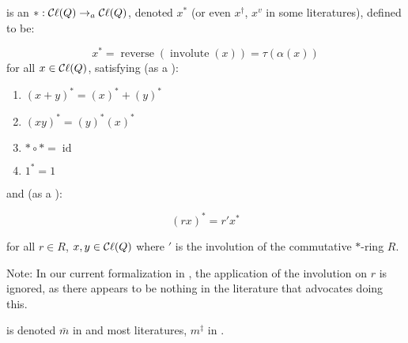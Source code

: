 \begin{definition}
    \label{conjugate}
    \leanok

     is an   ${*} : \mathop{\mathcal{C}\ell}(Q) \to_{a} \mathop{\mathcal{C}\ell}(Q)$,
    denoted $x^{*}$ (or even $x^\dagger$, $x^v$ in some literatures),
    defined to be:

    $$ x^{*} = \operatorname{reverse}(\operatorname{involute}(x)) = \tau(\alpha(x)) $$ for all $x \in \mathop{\mathcal{C}\ell}(Q)$, satisfying
    (as a \href{https://en.wikipedia.org/wiki/*-algebra#*-ring}{}):

    \begin{enumerate}

    \item $(x + y)^{*} = (x)^{*} + (y)^{*}$
    \item $(x y)^{*} = (y)^{*} (x)^{*}$
    \item ${*} \circ {*} = \operatorname{id}$
    \item $1^{*} = 1$
    
    \end{enumerate}

    and (as a \href{https://en.wikipedia.org/wiki/*-algebra#*-algebra}{}):

    $$ (r x)^{*} = r' x^{*} $$
    
    for all $r \in R$, $x, y \in \mathop{\mathcal{C}\ell}(Q)$ where $'$ is the involution of the commutative $*$-ring $R$.

    Note: In our current formalization in \Mathlib, the application of the involution on $r$ is ignored,
    as there appears to be nothing in the literature that advocates doing this.



     is denoted $\bar{m}$ in \cite{lounestoCliffordAlgebrasSpinors2001} and most literatures, $m^\ddagger$ in \cite{chisolm2012geometric}.

\end{definition}


